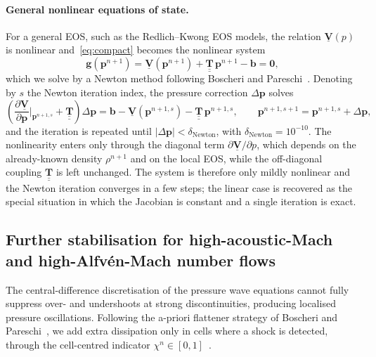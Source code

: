 \documentclass[a4paper,fleqn]{cas-sc}
\theoremstyle{definition}
\theoremstyle{remark}
\begin{document}
\paragraph{General nonlinear equations of state.}
For a general EOS, such as the Redlich--Kwong EOS
models, the relation $\underline{\mathbf{V}}(p)$ is nonlinear and~\eqref{eq:compact}
becomes the nonlinear system
\begin{equation}
\mathbf{g}(\mathbf{p}^{n+1})
= \underline{\mathbf{V}}(\mathbf{p}^{n+1})
+ \underline{\underline{\mathbf{T}}}\,\mathbf{p}^{n+1} - \mathbf{b} = \mathbf{0},
\end{equation}
which we solve by a Newton method following Boscheri and Pareschi~\cite{BoscheriPareschi2021}.
Denoting by $s$ the Newton iteration index, the pressure correction
$\Delta\mathbf{p}$ solves
\begin{equation}
\label{eq:newton_update}
\left(\frac{\partial\underline{\mathbf{V}}}{\partial\mathbf{p}}
\bigg|_{\mathbf{p}^{n+1,s}} + \underline{\underline{\mathbf{T}}}\right)
\Delta\mathbf{p}
= \mathbf{b} - \underline{\mathbf{V}}(\mathbf{p}^{n+1,s})
- \underline{\underline{\mathbf{T}}}\,\mathbf{p}^{n+1,s},
\qquad
\mathbf{p}^{n+1,s+1} = \mathbf{p}^{n+1,s} + \Delta\mathbf{p},
\end{equation}
and the iteration is repeated until $|\Delta\mathbf{p}|<\delta_\mathrm{Newton}$, with
$\delta_\mathrm{Newton}=10^{-10}$. The nonlinearity enters only through the diagonal term
$\partial\underline{\mathbf{V}}/\partial p$, which depends on the already-known
density $\rho^{n+1}$ and on the local EOS, while the off-diagonal coupling
$\underline{\underline{\mathbf{T}}}$ is left unchanged. The system is therefore
only mildly nonlinear and the Newton iteration converges in a few steps; the
linear case is recovered as the special situation in which the Jacobian is
constant and a single iteration is exact.



\subsection{Further stabilisation for high-acoustic-Mach and high-Alfvén-Mach number flows}
\label{sec:flattener_mhd}

The central-difference discretisation of the pressure wave equations cannot fully 
suppress over- and undershoots at strong discontinuities, producing localised 
pressure oscillations. Following the a-priori flattener strategy of Boscheri and 
Pareschi~\cite{BoscheriPareschi2021}, we add extra dissipation only in cells where a 
shock is detected, through the cell-centred indicator 
$\chi^{n}\in[0,1]$~\cite{Balsara2012}.
\end{document}
